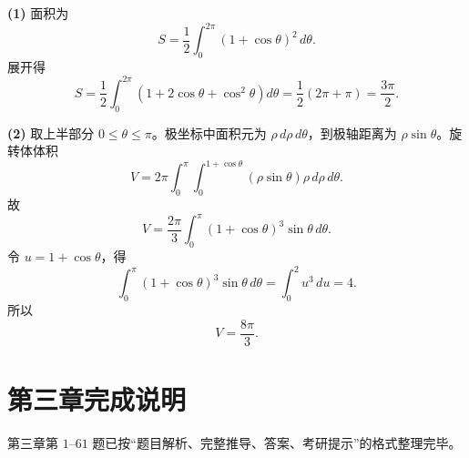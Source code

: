 \begin{solutionblock}
\textbf{(1)} 面积为
\[
S=\frac12\int_0^{2\pi}(1+\cos\theta)^2\,d\theta.
\]
展开得
\[
S=\frac12\int_0^{2\pi}(1+2\cos\theta+\cos^2\theta)d\theta
=\frac12(2\pi+\pi)
=\boxed{\frac{3\pi}{2}}.
\]

\textbf{(2)} 取上半部分 \(0\le\theta\le\pi\)。极坐标中面积元为 \(\rho\,d\rho\,d\theta\)，到极轴距离为 \(\rho\sin\theta\)。旋转体体积
\[
V=2\pi\int_0^\pi\int_0^{1+\cos\theta}
(\rho\sin\theta)\rho\,d\rho\,d\theta.
\]
故
\[
V=\frac{2\pi}{3}\int_0^\pi(1+\cos\theta)^3\sin\theta\,d\theta.
\]
令 \(u=1+\cos\theta\)，得
\[
\int_0^\pi(1+\cos\theta)^3\sin\theta\,d\theta
=\int_0^2u^3\,du=4.
\]
所以
\[
\boxed{V=\frac{8\pi}{3}}.
\]
\end{solutionblock}

\section{第三章完成说明}
第三章第 \(1\)--\(61\) 题已按“题目解析、完整推导、答案、考研提示”的格式整理完毕。
